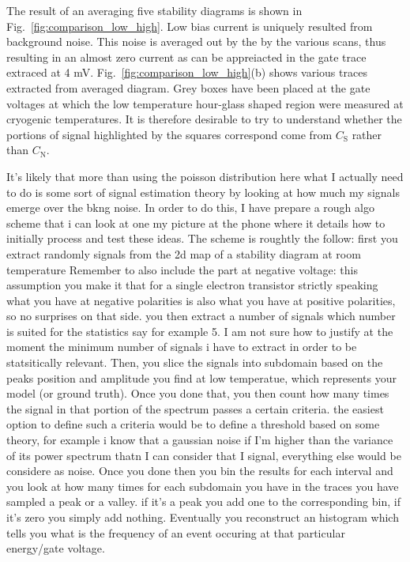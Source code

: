 The result of an averaging five stability diagrams is shown in Fig.~\ref{fig:comparison_low_high}. Low bias current is uniquely resulted from background noise. This noise is averaged out by the by the various scans, thus resulting in an almost zero current as can be appreiacted in the gate trace extraced at 4 mV. Fig.~\ref{fig:comparison_low_high}(b) shows various traces extracted from averaged diagram. Grey boxes have been placed at the gate voltages at which the low temperature hour-glass shaped region were measured at cryogenic temperatures. It is therefore desirable to try to understand whether the portions of signal highlighted by the squares correspond come from $C_\text{S}$ rather than $C_\text{N}$.

It's likely that more than using the poisson distribution here what I actually need to do is some sort of signal estimation theory by looking at how much
my signals emerge over the bkng noise. In order to do this, I have prepare a rough algo scheme that i can look at one my picture at the phone where it details
how to initially process and test these ideas. The scheme is roughtly the follow: first you extract randomly signals from the 2d map of a stability diagram at room temperature
Remember to also include the part at negative voltage: this assumption you make it that for a single electron transistor strictly speaking what you have at negative polarities
is also what you have at positive polarities, so no surprises on that side. you then extract a number of signals which number is suited for the statistics say for example 5. I am not sure how to justify at the moment the minimum number of signals i have to extract in order to be statsitically relevant. Then, you slice the signals into subdomain based on the peaks position and amplitude you find at low temperatue, which represents your model (or ground truth). Once you done that, you then count how many times the signal in that portion of the spectrum passes a certain criteria. the easiest option to define such a criteria would be to define a threshold based on some theory, for example i know that a gaussian noise if I'm higher than the variance of its power spectrum thatn I can consider that I signal, everything else would be considere as noise. Once you done then you bin the results for each interval and you look at how many times for each subdomain you have in the traces you have sampled a peak or a valley. if it's a peak you add one to the corresponding bin, if it's zero you simply add nothing. Eventually you reconstruct an histogram which tells you what is the frequency of an event occuring at that particular energy/gate voltage.


